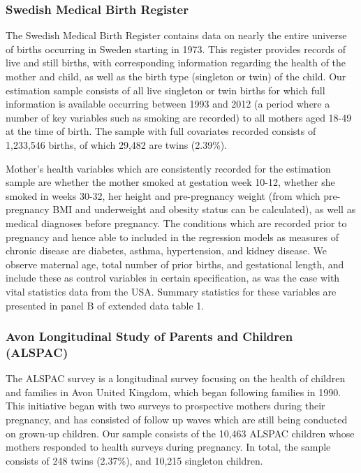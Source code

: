 \documentclass{nature}
\begin{document}
\begin{linenumbers}
\subsubsection{Swedish Medical Birth Register}
The Swedish Medical Birth Register contains data on nearly the entire universe of births occurring in Sweden starting in 1973\cite{EPC2003}.  This register provides records of live and still births, with corresponding information regarding the health of the mother and child, as well as the birth type (singleton or twin) of the child.  Our estimation sample consists of all live singleton or twin births for which full information is available occurring between 1993 and 2012 (a period where a number of key variables such as smoking are recorded) to all mothers aged 18-49 at the time of birth.  The sample with full covariates recorded consists of 1,233,546 births, of which 29,482 are twins (2.39\%). 

Mother's health variables which are consistently recorded for the estimation sample are whether the mother smoked at gestation week 10-12, whether she smoked in weeks 30-32, her height and pre-pregnancy weight (from which pre-pregnancy BMI and underweight and obesity status can be calculated), as well as medical diagnoses before pregnancy.  The conditions which are recorded prior to pregnancy and hence able to included in the regression models as measures of chronic disease are diabetes, asthma, hypertension, and kidney disease.  We observe maternal age, total number of prior births, and gestational length, and include these as control variables in certain specification, as was the case with vital statistics data from the USA.  Summary statistics for these variables are presented in panel B of extended data table 1.

\subsubsection{Avon Longitudinal Study of Parents and Children (ALSPAC)}
The ALSPAC survey is a longitudinal survey focusing on the health of children and families in Avon United Kingdom, which began following families in 1990.  This initiative began with two surveys to prospective mothers during their pregnancy, and has consisted of follow up waves which are still being conducted on grown-up children.  Our sample consists of the 10,463 ALSPAC children whose mothers responded to health surveys during pregnancy.  In total, the sample consists of 248 twins (2.37\%), and 10,215 singleton children.


\end{linenumbers}
\end{document}
